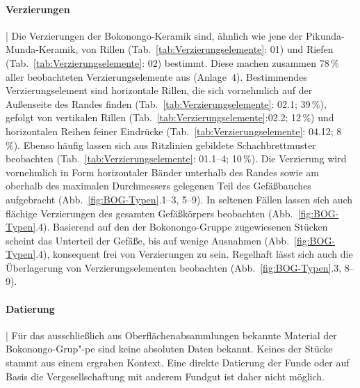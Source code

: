 \paragraph{Verzierungen}\hspace{-.5em}|\hspace{.5em}%
Die Verzierungen der Bokonongo-Keramik sind, ähnlich wie jene der Pikunda-Munda-Keramik, von Rillen (Tab.~\ref{tab:Verzierungselemente}: 01) und Riefen (Tab.~\ref{tab:Verzierungselemente}: 02) bestimmt. Diese machen zusammen 78\,\% aller beobachteten Verzierungselemente aus (Anlage~4). Bestimmendes Verzierungselement sind horizontale Rillen, die sich vornehmlich auf der Außenseite des Randes finden (Tab.~\ref{tab:Verzierungselemente}: 02.1; 39\,\%), gefolgt von vertikalen Rillen (Tab.~\ref{tab:Verzierungselemente}:02.2; 12\,\%) und horizontalen Reihen feiner Eindrücke (Tab.~\ref{tab:Verzierungselemente}: 04.12; 8\,\%). Ebenso häufig lassen sich aus Ritzlinien gebildete Schachbrettmuster beobachten (Tab.~\ref{tab:Verzierungselemente}: 01.1--4; 10\,\%). Die Verzierung wird vornehmlich in Form horizontaler Bänder unterhalb des Randes sowie am oberhalb des maximalen Durchmessers gelegenen Teil des Gefäßbauches aufgebracht (Abb.~\ref{fig:BOG-Typen}.1--3, 5--9). In seltenen Fällen lassen sich auch flächige Verzierungen des gesamten Gefäßkörpers beobachten (Abb.~\ref{fig:BOG-Typen}.4). Basierend auf den der Bokonongo-Gruppe zugewiesenen Stücken scheint das Unterteil der Gefäße, bis auf wenige Ausnahmen (Abb.~\ref{fig:BOG-Typen}.4), konsequent frei von Verzierungen zu sein. Regelhaft lässt sich auch die Überlagerung von Verzierungselementen beobachten (Abb.~\ref{fig:BOG-Typen}.3, 8--9).

\paragraph{Datierung}\hspace{-.5em}|\hspace{.5em}%
Für das ausschließlich aus Oberflächenabsammlungen bekannte Material der Bokonongo-Grup"-pe sind keine absoluten Daten bekannt. Keines der Stücke stammt aus einem ergraben Kontext. Eine direkte Datierung der Funde oder auf Basis die Vergesellschaftung mit anderem Fundgut ist daher nicht möglich.

